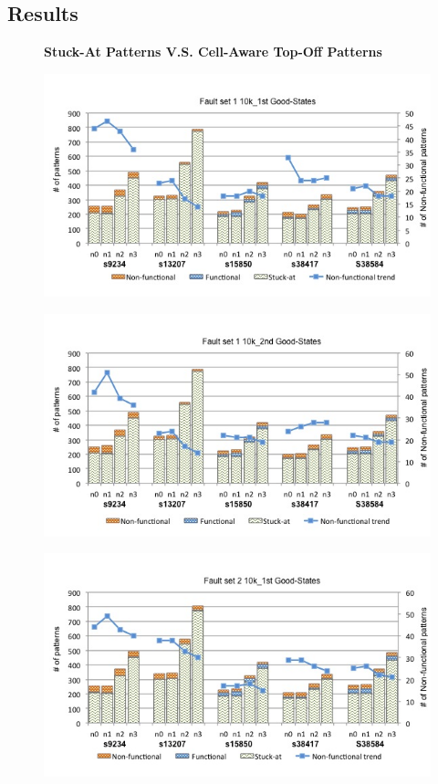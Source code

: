 \documentclass[10 pt, technote]{IEEEtran}
\begin{document}
\subsection{Results}

\begin{figure}[H]
\begin{center}
\textbf{Stuck-At Patterns V.S. Cell-Aware Top-Off Patterns}%
\end{center}
\includegraphics[scale=0.2,width = \linewidth]{../Figures/top_off_set1_10k_1st.jpg}
\end{figure}

\begin{figure}[H]
\includegraphics[scale=0.2,width = \linewidth]{../Figures/top_off_set1_10k_2nd.jpg}
\end{figure}

\begin{figure}[H]
\includegraphics[scale=0.2,width = \linewidth]{../Figures/top_off_set2_10k_1st.jpg}
\end{figure}
\end{document}

